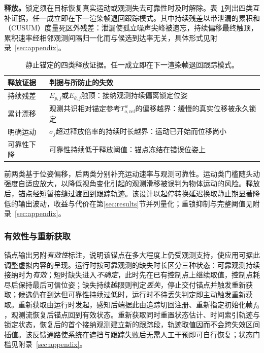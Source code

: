 \documentclass[review]{vgtc}
\begin{document}
\textbf{释放。}锁定须在目标恢复真实运动或观测失去可靠性时及时解除。表~\ref{tab:staticlock-release}列出四类互补证据，任一成立即在下一渲染帧退回跟踪模式。其中持续残差以带泄漏的累积和（CUSUM）度量死区外残差：泄漏使孤立噪声尖峰被遗忘，持续偏移最终触顶，累积速率经相邻观测间隔归一化而与候选到达率无关，具体形式见附录~\ref{sec:appendix}。

\begin{table}[t]
\centering
\caption{静止锚定的四类释放证据。任一成立即在下一渲染帧退回跟踪模式。}
\label{tab:staticlock-release}
\small
\begin{tabularx}{\columnwidth}{@{}l>{\raggedright\arraybackslash}X@{}}
\toprule
释放证据 & 判据与所防止的失效 \\
\midrule
持续残差 & $E_{p,j}$或$E_{\theta,j}$触顶：接纳观测持续偏离锁定位姿 \\
累计漂移 & 观测共识相对锚定参考$T_{o,\mathrm{ref}}^w$的偏移越界：缓慢的真实位移被永久锁定 \\
明确运动 & $\sigma_j$超过释放倍率的持续时长越界：运动已开始而位移尚小 \\
可靠性下降 & 可靠性持续低于释放阈值：锚点冻结在错误位姿上 \\
\bottomrule
\end{tabularx}
\end{table}

前两类基于位姿偏移，后两类分别补充运动速率与观测可靠性。运动类门槛随头动强度自适应放大，以降低视角变化引起的观测滑移被误判为物体运动的风险。释放后，锚点经短暂接缝过渡回到跟踪轨迹。该设计以起停转换延迟换取静止期显著降低的输出波动，收益与代价在第\ref{sec:results}节并列量化；重锁抑制与完整阈值见附录~\ref{sec:appendix}。

\subsubsection{有效性与重新获取}\label{sec:validity}

锚点输出另附\emph{有效性}标注，说明该锚点在多大程度上仍受观测支持，使应用可据此调整虚拟内容的呈现。运行时按可靠观测的缺失时长区分三种状态：可靠观测持续接纳时为\emph{有效}；短时缺失进入\emph{不确定}，此时先在已有控制点上继续取值，控制点耗尽后保持最后可信位姿；缺失持续越限则判定\emph{丢失}，停止交付锚点并触发重新获取；候选仍在到达但可靠性持续过低时，运行时不待丢失判定即主动触发重新获取。重新获取由运行时发起，感知后端据此由追踪切回注册、重新指定初始化帧$f_0$，观测流恢复后锚点回到有效状态。重新获取同时重置状态估计、时间索引轨迹与锁定状态，恢复后的首个接纳观测建立新的跟踪段，轨迹取值因而不会跨失效区间插值。该反馈通路使系统在遮挡与跟踪失败后无需人工干预即可自行恢复；状态门槛见附录~\ref{sec:appendix}。
\end{document}
